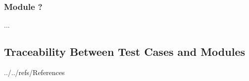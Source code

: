 \documentclass[12pt, titlepage]{article}
\begin{document}
\subsubsection{Module ?}

...

\subsection{Traceability Between Test Cases and Modules}

				


 {../../refs/References}







\end{document}
